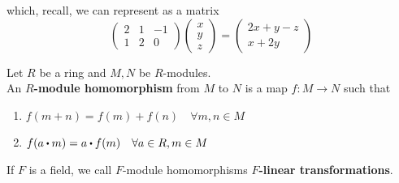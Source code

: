 \documentclass[../Main.tex]{subfiles}
\begin{document}
which, recall, we can represent as a matrix 
\[\begin{pmatrix}
2&1&-1\\
1&2&0
\end{pmatrix}\begin{pmatrix}
x\\y\\z
\end{pmatrix}=\begin{pmatrix}
2x+y-z\\x+2y
\end{pmatrix}\]
\begin{dfn}[title = {\texorpdfstring{$R$}{R}-module homomorphism, \texorpdfstring{$F$}{F}-linear transformation}]
	Let $R$ be a ring and $M,N$ be $R$-modules.\\
	An \textbf{$R$-module homomorphism} from $M$ to $N$ is a map $f\colon M\to N$ such that
	\begin{enumerate}[label=(\arabic*)]
		\item $f(m+n)=f(m)+f(n)\quad \forall m,n\in M$
		\item $f(a\rdot m) = a\rdot f(m) \quad \forall a \in R, m\in M$
	\end{enumerate}
	If $F$ is a field, we call $F$-module homomorphisms \textbf{$F$-linear transformations}.
\end{dfn}
\end{document}
